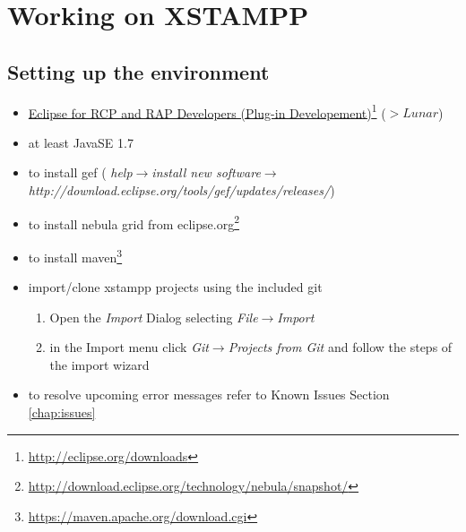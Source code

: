 \section{Working on XSTAMPP}

\subsection{Setting up the environment}
\begin{itemize}
\item \href{http://eclipse.org/downloads}{Eclipse for RCP and RAP Developers (Plug-in Developement)}\footnote{\url{http://eclipse.org/downloads}} ($> Lunar$)
\item at least JavaSE 1.7
\item to install gef ( \textit{help}$\rightarrow$\textit{install new software}$\rightarrow$\textit{http://download.eclipse.org/tools/gef/updates/releases/})
\item to install nebula grid from eclipse.org\footnote{\url{http://download.eclipse.org/technology/nebula/snapshot/}}
\item to install maven\footnote{\url{https://maven.apache.org/download.cgi}}
\item import/clone xstampp projects using the included git
	\begin{enumerate}
	\item Open the \textit{Import} Dialog selecting \textit{File}$\rightarrow$\textit{Import}
	\item in the Import menu click \textit{Git}$\rightarrow$\textit{Projects from Git} and follow the steps of the import wizard
	\end{enumerate}
\item to resolve upcoming error messages refer to Known Issues Section \ref{chap:issues}
\end{itemize}


